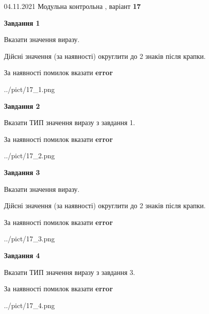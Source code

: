 \documentclass[11pt, ukrainian]{article}
\begin{document}
{04.11.2021 Модульна контрольна , варіант  \No \textbf { 17 }\par}
{
\begin {large}
{\begin {center}\textbf{Завдання 1}\end {center}}\par
Вказати значення виразу. \par
Дійсні значення (за наявності) округлити до 2 знаків після крапки. \par
За наявності помилок вказати \textbf{error}

\begin{center}
	{../pict/17_1.png}
\end{center}
\newpage

{\begin {center}\textbf{Завдання 2}\end {center}}\par
Вказати ТИП значення виразу з завдання 1. \par
За наявності помилок вказати \textbf{error}

\begin{center}
	{../pict/17_2.png}
\end{center}
\newpage

{\begin {center}\textbf{Завдання 3}\end {center}}\par
Вказати значення виразу. \par
Дійсні значення (за наявності) округлити до 2 знаків після крапки. \par
За наявності помилок вказати \textbf{error}

\begin{center}
	{../pict/17_3.png}
\end{center}
\newpage

{\begin {center}\textbf{Завдання 4}\end {center}}\par
Вказати ТИП значення виразу з завдання 3. \par
За наявності помилок вказати \textbf{error}

\begin{center}
	{../pict/17_4.png}
\end{center}
\newpage


\end{large}}
\end{document}
